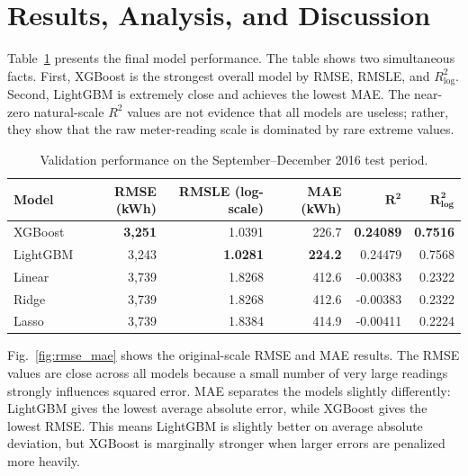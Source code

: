 \documentclass[conference]{IEEEtran}
\begin{document}
\section{Results, Analysis, and Discussion}
Table~\ref{tab:results} presents the final model performance. The table shows two simultaneous facts. First, XGBoost is the strongest overall model by RMSE, RMSLE, and $R^2_{\log}$. Second, LightGBM is extremely close and achieves the lowest MAE. The near-zero natural-scale $R^2$ values are not evidence that all models are useless; rather, they show that the raw meter-reading scale is dominated by rare extreme values.
\begin{table}[!t]
\centering
\caption{Validation performance on the September--December 2016 test period.}
\label{tab:results}
\footnotesize
\setlength{\tabcolsep}{1.0pt}
\renewcommand{\arraystretch}{1.12}
\begin{tabular}{@{}lrrrrr@{}}
\toprule
\textbf{Model} 
& \textbf{RMSE (kWh)} 
& \textbf{RMSLE (log-scale)} 
& \textbf{MAE (kWh)} 
& $\boldsymbol{R^2}$ 
& $\boldsymbol{R^2_{\log}}$ \\
\midrule
XGBoost  & \textbf{3,251} & 1.0391 & 226.7          & \textbf{0.24089}  & \textbf{0.7516} \\
LightGBM & 3,243          & \textbf{1.0281}          & \textbf{224.2} & 0.24479           & 0.7568 \\
Linear   & 3,739          & 1.8268          & 412.6          & -0.00383          & 0.2322 \\
Ridge    & 3,739          & 1.8268          & 412.6          & -0.00383          & 0.2322 \\
Lasso    & 3,739          & 1.8384          & 414.9          & -0.00411          & 0.2224 \\
\bottomrule
\end{tabular}

\vspace{2pt}
\end{table}
Fig.~\ref{fig:rmse_mae} shows the original-scale RMSE and MAE results. The RMSE values are close across all models because a small number of very large readings strongly influences squared error. MAE separates the models slightly differently: LightGBM gives the lowest average absolute error, while XGBoost gives the lowest RMSE. This means LightGBM is slightly better on average absolute deviation, but XGBoost is marginally stronger when larger errors are penalized more heavily.
\end{document}
